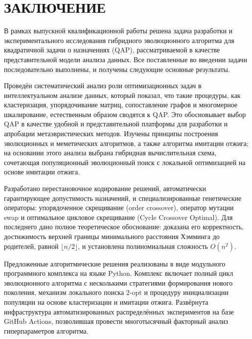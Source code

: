 \documentclass[732]{studrep}
\theoremstyle{nonumberplain}
\begin{document}
\chapter*{ЗАКЛЮЧЕНИЕ}
\label{chap:conclusion}

В рамках выпускной квалификационной работы решена задача разработки и экспериментального исследования гибридного эволюционного алгоритма для квадратичной задачи о назначениях (QAP), рассматриваемой в качестве представительной модели анализа данных. Все поставленные во введении задачи последовательно выполнены, и получены следующие основные результаты.

Проведён систематический анализ роли оптимизационных задач в интеллектуальном анализе данных, который показал, что такие процедуры, как кластеризация, упорядочивание матриц, сопоставление графов и многомерное шкалирование, естественным образом сводятся к QAP. Это обосновывает выбор QAP в качестве удобной и представительной платформы для разработки и апробации метаэвристических методов. Изучены принципы построения эволюционных и меметических алгоритмов, а также алгоритма имитации отжига; на основании этого анализа выбрана гибридная вычислительная схема, сочетающая популяционный эволюционный поиск с локальной оптимизацией на основе имитации отжига.

Разработано перестановочное кодирование решений, автоматически гарантирующее допустимость назначений, и специализированные генетические операторы: упорядоченное скрещивание (order crossover), оператор мутации swap и оптимальное цикловое скрещивание (Cycle Crossover Optimal). Для последнего дано полное теоретическое обоснование: доказана его корректность, достижимость верхней границы минимального расстояния Хэмминга до родителей, равной $\lfloor n/2\rfloor$, и установлена полиномиальная сложность $O(n^2)$.

Предложенные алгоритмические решения реализованы в виде модульного программного комплекса на языке Python. Комплекс включает полный цикл эволюционного алгоритма с несколькими стратегиями формирования нового поколения, механизм локального поиска 2-opt и процедуру инициализации популяции на основе кластеризации и имитации отжига. Развёрнута инфраструктура автоматизированных распределённых экспериментов на базе GitHub Actions, позволившая провести многотысячный факторный анализ гиперпараметров алгоритма.
\end{document}
